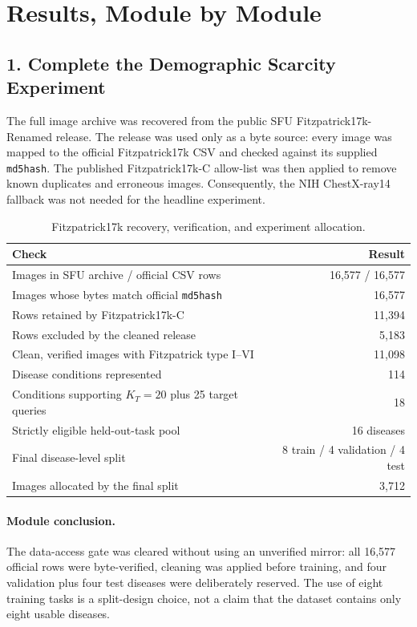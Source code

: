 \documentclass{article}
\newcommand{\KT}{K_T}
\begin{document}
\section{Results, Module by Module}

\subsection{1. Complete the Demographic Scarcity Experiment}

The full image archive was recovered from the public SFU Fitzpatrick17k-Renamed release. The release was used only as a byte source: every image was mapped to the official Fitzpatrick17k CSV and checked against its supplied \texttt{md5hash}. The published Fitzpatrick17k-C allow-list was then applied to remove known duplicates and erroneous images. Consequently, the NIH ChestX-ray14 fallback was not needed for the headline experiment.

\begin{table}[h]
\caption{Fitzpatrick17k recovery, verification, and experiment allocation.}
\label{tab:recovery}
\centering
\small
\begin{tabular}{lr}
\toprule
Check & Result \\
\midrule
Images in SFU archive / official CSV rows & 16,577 / 16,577 \\
Images whose bytes match official \texttt{md5hash} & 16,577 \\
Rows retained by Fitzpatrick17k-C & 11,394 \\
Rows excluded by the cleaned release & 5,183 \\
Clean, verified images with Fitzpatrick type I--VI & 11,098 \\
Disease conditions represented & 114 \\
Conditions supporting $\KT=20$ plus 25 target queries & 18 \\
Strictly eligible held-out-task pool & 16 diseases \\
Final disease-level split & 8 train / 4 validation / 4 test \\
Images allocated by the final split & 3,712 \\
\bottomrule
\end{tabular}
\end{table}

\paragraph{Module conclusion.}
The data-access gate was cleared without using an unverified mirror: all 16,577 official rows were byte-verified, cleaning was applied before training, and four validation plus four test diseases were deliberately reserved. The use of eight training tasks is a split-design choice, not a claim that the dataset contains only eight usable diseases.
\end{document}
